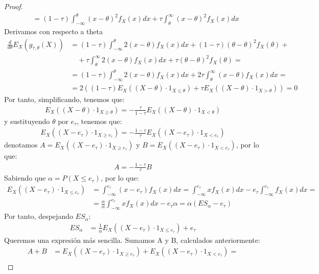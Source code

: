 \documentclass[11pt]{book}
\theoremstyle{plain} %
\theoremstyle{definition} %
\begin{document}
\begin{proof}
\begin{align*}
      &= (1 - \tau)\int_{-\infty}^{\theta}(x - \theta)^2 f_X(x)dx + \tau \int_{\theta}^{\infty}(x - \theta)^2 f_X(x)dx
   \end{align*}
   Derivamos con respecto a theta
   \begin{align*}
      \frac{d}{d\theta}E_{X}(g_{\tau, \theta}(X)) &= (1 - \tau)\int_{-\infty}^{\theta}2(x - \theta)f_X(x)dx + (1 - \tau)(\theta - \theta)^2 f_X(\theta) + \\
      &\quad + \tau\int_{\theta}^{\infty}2(x - \theta)f_X(x)dx + \tau(\theta - \theta)^2 f_X(\theta) = \\
      &= (1 - \tau)\int_{-\infty}^{\theta}2(x - \theta)f_X(x)dx + 2\tau\int_{\theta}^{\infty}(x - \theta)f_X(x)dx = \\
      &= 2((1-\tau)E_{X}((X-\theta)\cdot 1_{X\leq \theta}) + \tau E_{X}((X-\theta)\cdot 1_{X >\theta})) = 0
   \end{align*} 
   Por tanto, simplificando, tenemos que:
   \begin{align*}
      E_{X}((X-\theta)\cdot 1_{X\geq \theta}) = -\frac{\tau}{1-\tau}E_{X}((X-\theta)\cdot 1_{X<\theta})
   \end{align*}
   y sustituyendo $\theta$ por $e_\tau$, tenemos que:
   \begin{align*}
      E_{X}((X-e_\tau)\cdot 1_{X\geq e_\tau}) = -\frac{1-\tau}{\tau}E_{X}((X-e_\tau)\cdot 1_{X<e_\tau})
   \end{align*}
   denotamos $A = E_{X}((X-e_\tau)\cdot 1_{X\geq e_\tau})$ y $B = E_{X}((X-e_\tau)\cdot 1_{X<e_\tau})$, por lo que:
   \begin{align*}
      A = -\frac{1-\tau}{\tau}B
   \end{align*}
   Sabiendo que $\alpha = P(X \leq e_\tau)$, por lo que:
   \begin{align*}
      E_{X}((X-e_\tau)\cdot 1_{X \leq e_\tau}) &= \int_{-\infty}^{e_\tau}(x-e_\tau)f_X(x)dx = \int_{-\infty}^{e_\tau}xf_X(x)dx - e_\tau \int_{-\infty}^{e_\tau}f_X(x)dx = \\
      &= \frac{\alpha}{\alpha}\int_{-\infty}^{e_\tau}xf_X(x)dx - e_\tau \alpha = \alpha (ES_\alpha - e_\tau)
   \end{align*}
   Por tanto, despejando $ES_\alpha$:
   \begin{align*}
      ES_\alpha &= \frac{1}{\alpha}E_{X}((X-e_\tau)\cdot 1_{X \leq e_\tau}) + e_\tau
   \end{align*}
   Queremos una expresión más sencilla. Sumamos A y B, calculados anteriormente:
   \begin{align*}
      A + B &= E_{X}((X-e_\tau)\cdot 1_{X\geq e_\tau}) + E_{X}((X-e_\tau)\cdot 1_{X<e_\tau}) = \\

\end{align*}
\end{proof}
\end{document}
